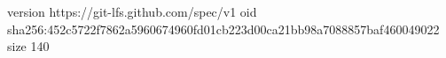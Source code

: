 version https://git-lfs.github.com/spec/v1
oid sha256:452c5722f7862a5960674960fd01cb223d00ca21bb98a7088857baf460049022
size 140
